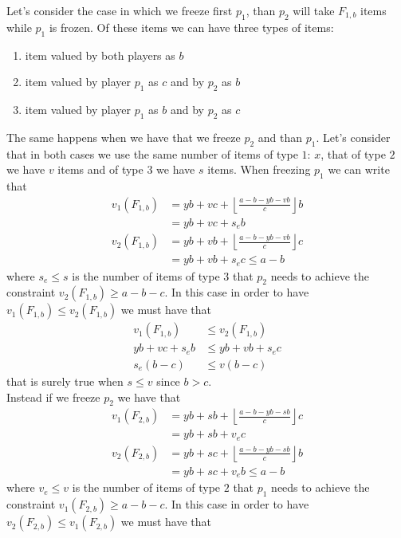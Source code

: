 \documentclass{article}
\begin{document}
Let's consider the case in which we freeze first $p_1$, than $p_2$ will take $F_{1,b}$ items while $p_1$ is frozen. Of these items we can have three types of items: 
\begin{enumerate}
    \item item valued by both players as $b$
    \item item valued by player $p_1$ as $c$ and by $p_2$ as $b$
    \item item valued by player $p_1$ as $b$ and by $p_2$ as $c$
\end{enumerate}
The same happens when we have that we freeze $p_2$ and than $p_1$. Let's consider that in both cases we use the same number of items of type $1$: $x$, that of type $2$ we have $v$ items and of type $3$ we have $s$ items. 
When freezing $p_1$ we can write that 
\begin{align*}
    v_1(F_{1,b}) &= yb + vc + \left\lfloor \frac{a-b-yb-vb}{c}\right\rfloor b \\
                & = yb + vc + s_e b\\
    v_2(F_{1,b}) &= yb + vb + \left\lfloor \frac{a-b-yb-vb}{c}\right\rfloor c \\
                & = yb + vb + s_e c \le a-b
\end{align*}
where $s_e\le s$ is the number of items of type $3$ that $p_2$ needs to achieve the constraint $v_2(F_{1,b})\ge a-b-c$. In this case in order to have $v_1(F_{1,b}) \le v_2(F_{1,b})$ we must have that
\begin{align*}
    v_1(F_{1,b}) &\le v_2(F_{1,b})\\
    yb + vc + s_e b &\le yb + vb + s_e c\\
    s_e(b-c) &\le v(b-c)
\end{align*}
that is surely true when $s\le v$ since $b> c$.\\
Instead if we freeze $p_2$ we have that
\begin{align*}
    v_1(F_{2,b}) &= yb + sb + \left\lfloor \frac{a-b-yb-sb}{c}\right\rfloor c \\
                & = yb + sb + v_e c\\
    v_2(F_{2,b}) &= yb + sc + \left\lfloor \frac{a-b-yb-sb}{c}\right\rfloor b \\
                & = yb + sc + v_e b \le a-b
\end{align*}
where $v_e\le v$ is the number of items of type $2$ that $p_1$ needs to achieve the constraint $v_1(F_{2,b})\ge a-b-c$. In this case in order to have $v_2(F_{2,b}) \le v_1(F_{2,b})$ we must have that
\end{document}
